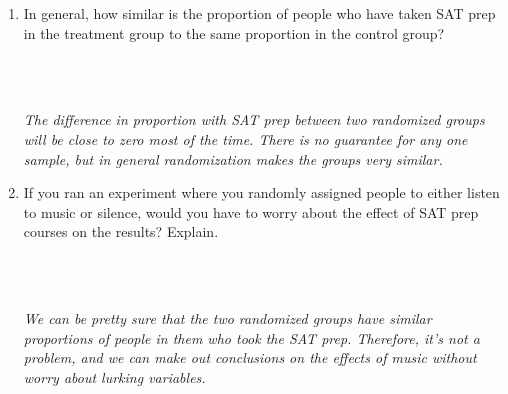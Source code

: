 \begin{enumerate}
\item In general, how similar is the proportion of people who have
  taken SAT prep in the treatment group to the same proportion in the
  control group? 
\begin{students}
        \vspace{3cm}\\
\end{students}
\begin{key}
  \\ {\it  The difference in proportion with SAT prep between two
    randomized groups will be close to zero most of the time.  There
    is no guarantee for any one sample, but in general randomization
    makes the groups very similar.} 
\end{key}
\item If you ran an experiment where you randomly assigned people to
  either listen to music or silence, would you have to worry about the effect
  of SAT prep courses on the results?  Explain. 
\begin{students}
        \vspace{6cm}\\
\end{students}
\begin{key}
  \\ {\it We can be pretty sure that the two randomized groups have
    similar proportions of people in them who took the SAT prep.
    Therefore, it's not a problem, and we can make out conclusions on
    the effects of music without worry about lurking variables.}
\end{key} 
\end{enumerate}





